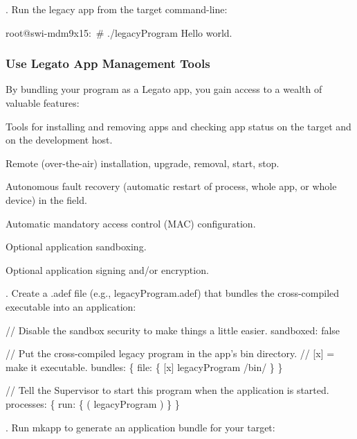 {}. Run the legacy app from the target command-\/line\+:


\begin{DoxyCode}
root@swi-mdm9x15:~# ./legacyProgram
Hello world.
\end{DoxyCode}
\hypertarget{how_to_port_legacy_c_howtoPortingLegacyC_UseLegatoAppManagementTools}{}\subsubsection{Use Legato App Management Tools}\label{how_to_port_legacy_c_howtoPortingLegacyC_UseLegatoAppManagementTools}
By bundling your program as a Legato app, you gain access to a wealth of valuable features\+:
\begin{DoxyItemize}
\item Tools for installing and removing apps and checking app status on the target and on the development host.
\item Remote (over-\/the-\/air) installation, upgrade, removal, start, stop.
\item Autonomous fault recovery (automatic restart of process, whole app, or whole device) in the field.
\item Automatic mandatory access control (M\+A\+C) configuration.
\item Optional application sandboxing.
\item Optional application signing and/or encryption.
\end{DoxyItemize}

{}. Create a {\ttfamily  .adef } file (e.\+g., {\ttfamily legacy\+Program.\+adef}) that bundles the cross-\/compiled executable into an application\+:


\begin{DoxyCode}
\textcolor{comment}{// Disable the sandbox security to make things a little easier.}
sandboxed: \textcolor{keyword}{false}

\textcolor{comment}{// Put the cross-compiled legacy program in the app's bin directory.}
\textcolor{comment}{// [x] = make it executable.}
bundles:
\{
    file:
    \{
        [x] legacyProgram /bin/
    \}
\}

\textcolor{comment}{// Tell the Supervisor to start this program when the application is started.}
processes:
\{
    run:
    \{
        ( legacyProgram )
    \}
\}
\end{DoxyCode}


{}. Run {\ttfamily mkapp} to generate an application bundle for your target\+:


